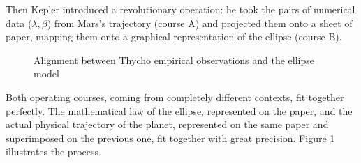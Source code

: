 \documentclass[11pt, a4paper]{article}
\begin{document}
Then Kepler introduced a revolutionary operation: he took the pairs of numerical data ($\lambda, \beta$) from Mars's trajectory (course A) and projected them onto a sheet of paper, mapping them onto a graphical representation of the ellipse (course B).


\begin{figure}[htbp]
\centering
{}
\caption{Alignment between Thycho empirical observations and the ellipse model}
\label{fig:kepler_alignment}
\end{figure}


Both operating courses, coming from completely different contexts, fit together perfectly. The mathematical law of the ellipse, represented on the paper, and the actual physical trajectory of the planet, represented on the same paper and superimposed on the previous one, fit together with great precision. Figure \ref{fig:kepler_alignment} illustrates the process.
\end{document}
